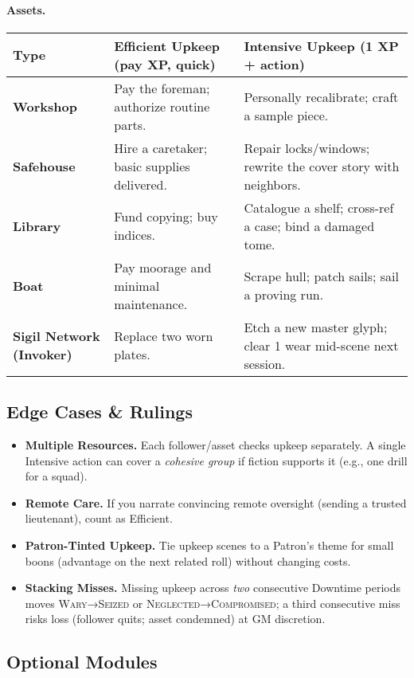 \paragraph{Assets.}
\begin{tabularx}{\linewidth}{>{\bfseries}l X X}
\toprule
Type & Efficient Upkeep (pay XP, quick) & Intensive Upkeep (1 XP + action) \\
\midrule
Workshop & Pay the foreman; authorize routine parts. & Personally recalibrate; craft a sample piece. \\
Safehouse & Hire a caretaker; basic supplies delivered. & Repair locks/windows; rewrite the cover story with neighbors. \\
Library & Fund copying; buy indices. & Catalogue a shelf; cross-ref a case; bind a damaged tome. \\
Boat & Pay moorage and minimal maintenance. & Scrape hull; patch sails; sail a proving run. \\
Sigil Network (Invoker) & Replace two worn plates. & Etch a new master glyph; clear 1 wear mid-scene next session. \\
\bottomrule
\end{tabularx}

\subsection{Edge Cases \& Rulings}\label{subsec:upkeep-edge}
\begin{itemize}
\item \textbf{Multiple Resources.} Each follower/asset checks upkeep separately. A single Intensive action can cover a \emph{cohesive group} if fiction supports it (e.g., one drill for a squad).
\item \textbf{Remote Care.} If you narrate convincing remote oversight (sending a trusted lieutenant), count as Efficient.
\item \textbf{Patron-Tinted Upkeep.} Tie upkeep scenes to a Patron's theme for small boons (advantage on the next related roll) without changing costs.
\item \textbf{Stacking Misses.} Missing upkeep across \emph{two} consecutive Downtime periods moves \textsc{Wary}→\textsc{Seized} or \textsc{Neglected}→\textsc{Compromised}; a third consecutive miss risks loss (follower quits; asset condemned) at GM discretion.
\end{itemize}

\subsection{Optional Modules}\label{subsec:upkeep-modules}
